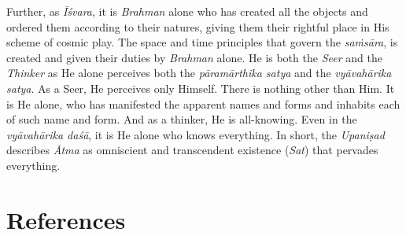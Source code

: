 Further, as \emph{Īśvara}, it is \emph{Brahman} alone who has created all the objects and ordered them according to their natures, giving them their rightful place in His scheme of cosmic play. The space and time principles that govern the \emph{saṁsāra}, is created and given their duties by \emph{Brahman} alone. He is both the \emph{Seer} and the \emph{Thinker} as He alone perceives both the \emph{pāramārthika satya} and the \emph{vyāvahārika satya}. As a Seer, He perceives only Himself. There is nothing other than Him. It is He alone, who has manifested the apparent names and forms and inhabits each of such name and form. And as a thinker, He is all-knowing. Even in the \emph{vyāvahārika daśā}, it is He alone who knows everything. In short, the \emph{Upaniṣad} describes \emph{Ātma} as omniscient and transcendent existence (\emph{Sat}) that pervades everything.

\section*{References}

